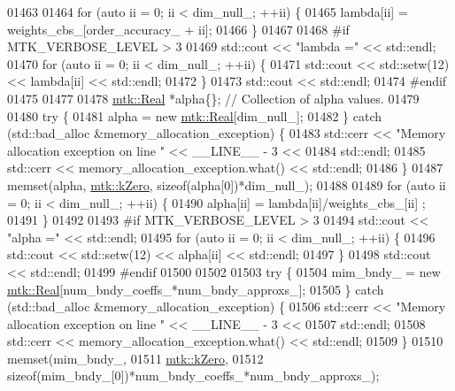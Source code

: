 \begin{DoxyCode}
{{01463 
01464   \textcolor{keywordflow}{for} (\textcolor{keyword}{auto} ii = 0; ii < dim\_null\_; ++ii) \{
01465     lambda[ii] = weights\_cbs\_[order\_accuracy\_ + ii];
01466   \}
01467 
01468 \textcolor{preprocessor}{  #if MTK\_VERBOSE\_LEVEL > 3}
01469   std::cout << \textcolor{stringliteral}{"lambda ="} << std::endl;
01470   \textcolor{keywordflow}{for} (\textcolor{keyword}{auto} ii = 0; ii < dim\_null\_; ++ii) \{
01471     std::cout << std::setw(12) << lambda[ii] << std::endl;
01472   \}
01473   std::cout << std::endl;
01474 \textcolor{preprocessor}{  #endif}
01475 
01477 
01478   \hyperlink{group__c01-roots_gac080bbbf5cbb5502c9f00405f894857d}{mtk::Real} *alpha\{\}; \textcolor{comment}{// Collection of alpha values.}
01479 
01480   \textcolor{keywordflow}{try} \{
01481     alpha = \textcolor{keyword}{new} \hyperlink{group__c01-roots_gac080bbbf5cbb5502c9f00405f894857d}{mtk::Real}[dim\_null\_];
01482   \} \textcolor{keywordflow}{catch} (std::bad\_alloc &memory\_allocation\_exception) \{
01483     std::cerr << \textcolor{stringliteral}{"Memory allocation exception on line "} << \_\_LINE\_\_ - 3 <<
01484       std::endl;
01485     std::cerr << memory\_allocation\_exception.what() << std::endl;
01486   \}
01487   memset(alpha, \hyperlink{group__c01-roots_ga59a451a5fae30d59649bcda274fea271}{mtk::kZero}, \textcolor{keyword}{sizeof}(alpha[0])*dim\_null\_);
01488 
01489   \textcolor{keywordflow}{for} (\textcolor{keyword}{auto} ii = 0; ii < dim\_null\_; ++ii) \{
01490     alpha[ii] = lambda[ii]/weights\_cbs\_[ii] ;
01491   \}
01492 
01493 \textcolor{preprocessor}{  #if MTK\_VERBOSE\_LEVEL > 3}
01494   std::cout << \textcolor{stringliteral}{"alpha ="} << std::endl;
01495   \textcolor{keywordflow}{for} (\textcolor{keyword}{auto} ii = 0; ii < dim\_null\_; ++ii) \{
01496     std::cout << std::setw(12) << alpha[ii] << std::endl;
01497   \}
01498   std::cout << std::endl;
01499 \textcolor{preprocessor}{  #endif}
01500 
01502 
01503   \textcolor{keywordflow}{try} \{
01504     mim\_bndy\_ = \textcolor{keyword}{new} \hyperlink{group__c01-roots_gac080bbbf5cbb5502c9f00405f894857d}{mtk::Real}[num\_bndy\_coeffs\_*num\_bndy\_approxs\_];
01505   \} \textcolor{keywordflow}{catch} (std::bad\_alloc &memory\_allocation\_exception) \{
01506     std::cerr << \textcolor{stringliteral}{"Memory allocation exception on line "} << \_\_LINE\_\_ - 3 <<
01507       std::endl;
01508     std::cerr << memory\_allocation\_exception.what() << std::endl;
01509   \}
01510   memset(mim\_bndy\_,
01511          \hyperlink{group__c01-roots_ga59a451a5fae30d59649bcda274fea271}{mtk::kZero},
01512          \textcolor{keyword}{sizeof}(mim\_bndy\_[0])*num\_bndy\_coeffs\_*num\_bndy\_approxs\_);
}}
\end{DoxyCode}
